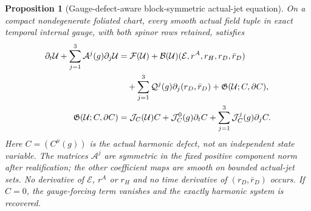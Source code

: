 \documentclass[11pt]{article}
\numberwithin{equation}{section}
\newtheorem{proposition}[proposition]{Proposition}
\theoremstyle{definition}
\theoremstyle{remark}
\begin{document}
\begin{proposition}[Gauge-defect-aware block-symmetric actual-jet equation]
\label{prop:actual-jet-writer}
On a compact nondegenerate foliated chart, every smooth actual field tuple
in exact temporal internal gauge, with both spinor rows retained, satisfies
\begin{align}
 \partial_t\mathcal U+\sum_{j=1}^3\mathcal A^j(g)\partial_j\mathcal U
 &=\mathcal F(\mathcal U)
   +\mathcal B(\mathcal U)(\mathcal E,r^A,r_H,r_D,\bar r_D)\notag\\
 &\quad+\sum_{j=1}^3\mathcal Q^j(g)\partial_j(r_D,\bar r_D)
        +\mathfrak G(\mathcal U;C,\partial C),
 \label{eq:actual-jet-writer}\\
 \mathfrak G(\mathcal U;C,\partial C)
 &=\mathcal J_C(\mathcal U)C+
       \mathcal J_C^0(g)\partial_tC+
       \sum_{j=1}^3\mathcal J_C^j(g)\partial_jC.
 \label{eq:actual-jet-gauge-forcing}
\end{align}
Here $C=(C^\mu(g))$ is the actual harmonic defect, not an independent state
variable. The matrices $\mathcal A^j$ are symmetric in the fixed positive
component norm after realification; the other coefficient maps are smooth
on bounded actual-jet sets. No derivative of $\mathcal E$, $r^A$ or $r_H$
and no time derivative of $(r_D,\bar r_D)$ occurs. If $C=0$, the gauge-forcing
term vanishes and the exactly harmonic system is recovered.
\end{proposition}
\end{document}
